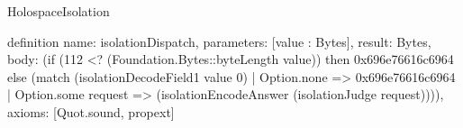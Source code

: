 \begin{lexlean}{HolospaceIsolation}
\begin{semanticmodule}
definition{
  name: isolationDispatch,
  parameters: [value : Bytes],
  result: Bytes,
  body: (if (112 <? (Foundation.Bytes::byteLength value)) then 0x696e76616c6964 else (match (isolationDecodeField1 value 0)
    | Option.none => 0x696e76616c6964
    | Option.some request => (isolationEncodeAnswer (isolationJudge request)))),
  axioms: [Quot.sound, propext]
}
\end{semanticmodule}
\end{lexlean}
